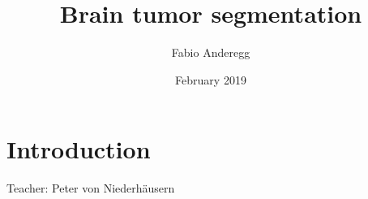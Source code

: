 \documentclass{article}
\title{Brain tumor segmentation}
\author{Fabio Anderegg }
\date{February 2019}
\begin{document}
\maketitle

\section{Introduction}

Teacher: Peter von Niederhäusern
\end{document}
